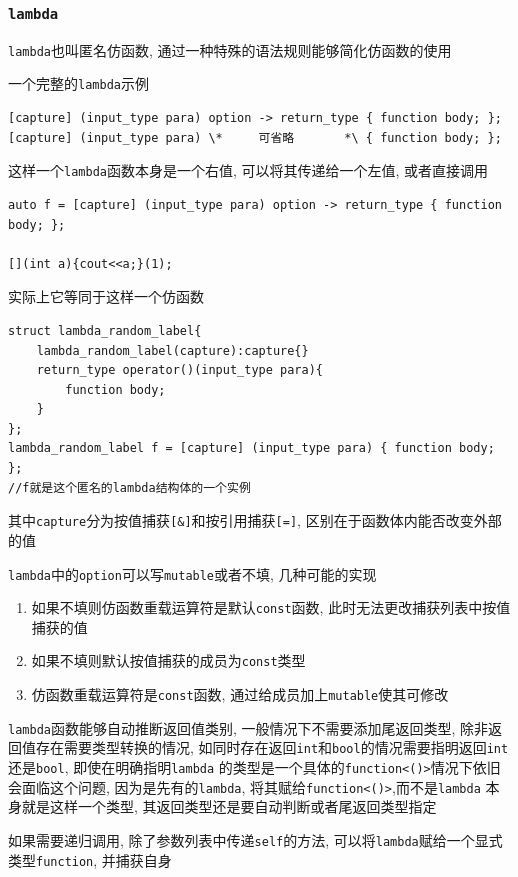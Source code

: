 \subsubsection{{\tt lambda}}
{\tt lambda}也叫匿名仿函数, 通过一种特殊的语法规则能够简化仿函数的使用

一个完整的{\tt lambda}示例
\begin{lstlisting}
[capture] (input_type para) option -> return_type { function body; };
[capture] (input_type para) \*     可省略       *\ { function body; };
\end{lstlisting}
这样一个{\tt lambda}函数本身是一个右值, 可以将其传递给一个左值, 或者直接调用
\begin{lstlisting}
auto f = [capture] (input_type para) option -> return_type { function body; };

[](int a){cout<<a;}(1);
\end{lstlisting}

实际上它等同于这样一个仿函数

\begin{lstlisting}
struct lambda_random_label{
	lambda_random_label(capture):capture{}
	return_type operator()(input_type para){
		function body;
	}
};
lambda_random_label f = [capture] (input_type para) { function body; };
//f就是这个匿名的lambda结构体的一个实例
\end{lstlisting}

其中{\tt capture}分为按值捕获{\tt[\&]}和按引用捕获{\tt[=]}, 区别在于函数体内能否改变外部的值

{\tt lambda}中的{\tt option}可以写{\tt mutable}或者不填, 几种可能的实现
\begin{enumerate}
	\item 如果不填则仿函数重载运算符是默认{\tt const}函数, 此时无法更改捕获列表中按值捕获的值
	\item 如果不填则默认按值捕获的成员为{\tt const}类型
	\item 仿函数重载运算符是{\tt const}函数, 通过给成员加上{\tt mutable}使其可修改
\end{enumerate}

{\tt lambda}函数能够自动推断返回值类别, 一般情况下不需要添加尾返回类型, 除非返回值存在需要类型转换的情况, 
	如同时存在返回{\tt int}和{\tt bool}的情况需要指明返回{\tt int}还是{\tt bool}, 即使在明确指明{\tt lambda}
	的类型是一个具体的{\tt function<()>}情况下依旧会面临这个问题, 因为是先有的{\tt lambda}, 将其赋给{\tt function<()>},而不是{\tt lambda}
	本身就是这样一个类型, 其返回类型还是要自动判断或者尾返回类型指定

如果需要递归调用, 除了参数列表中传递{\tt self}的方法, 可以将{\tt lambda}赋给一个显式类型{\tt function}, 并捕获自身
